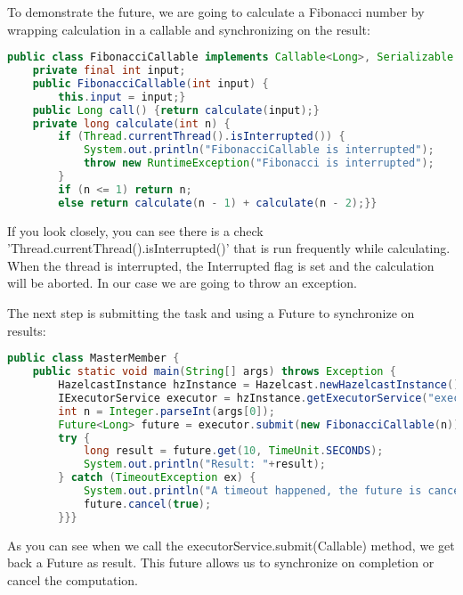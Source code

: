 To demonstrate the future, we are going to calculate a Fibonacci number by wrapping calculation in a callable and synchronizing on the result:
\begin{lstlisting}[language=java]
public class FibonacciCallable implements Callable<Long>, Serializable {
    private final int input;
    public FibonacciCallable(int input) {
        this.input = input;}
    public Long call() {return calculate(input);}
    private long calculate(int n) {
        if (Thread.currentThread().isInterrupted()) {
            System.out.println("FibonacciCallable is interrupted");
            throw new RuntimeException("Fibonacci is interrupted");
        }
        if (n <= 1) return n;
        else return calculate(n - 1) + calculate(n - 2);}}
\end{lstlisting}
If you look closely, you can see there is a check 'Thread.currentThread().isInterrupted()' that is run frequently while calculating. When the thread is interrupted, the Interrupted flag is set and the calculation will be aborted. In our case we are going to throw an exception.

The next step is submitting the task and using a Future to synchronize on results:
\begin{lstlisting}[language=java]
public class MasterMember {
    public static void main(String[] args) throws Exception {
        HazelcastInstance hzInstance = Hazelcast.newHazelcastInstance();
        IExecutorService executor = hzInstance.getExecutorService("executor");
        int n = Integer.parseInt(args[0]);
        Future<Long> future = executor.submit(new FibonacciCallable(n));
        try {
            long result = future.get(10, TimeUnit.SECONDS);
            System.out.println("Result: "+result);
        } catch (TimeoutException ex) {
            System.out.println("A timeout happened, the future is cancelled");
            future.cancel(true);
        }}}
\end{lstlisting}
As you can see when we call the executorService.submit(Callable) method, we get back a Future as result. This future allows us to synchronize on completion or cancel the computation. 

